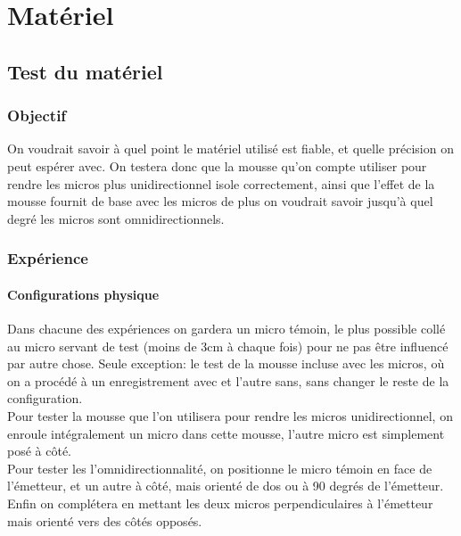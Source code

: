 

%

\part{Matériel}

\chapter{Test du matériel}

\section{Objectif}
On voudrait savoir à quel point le matériel utilisé est fiable, et quelle précision on peut espérer avec.
On testera donc que la mousse qu'on compte utiliser pour rendre les micros plus unidirectionnel isole correctement, ainsi que l'effet de la mousse fournit de base avec les micros de plus on voudrait savoir jusqu'à quel degré les micros sont omnidirectionnels.
\section{Expérience}

\subsection{Configurations physique}
Dans chacune des expériences on gardera un micro témoin, le plus possible collé au micro servant de test (moins de 3cm à chaque fois) pour ne pas être influencé par autre chose. Seule exception: le test de la mousse incluse avec les micros, où on a procédé à un enregistrement avec et l'autre sans, sans changer le reste de la configuration.\\
Pour tester la mousse que l'on utilisera pour rendre les micros unidirectionnel, on enroule intégralement un micro dans cette mousse, l'autre micro est simplement posé à côté.\\
Pour tester les l'omnidirectionnalité, on positionne le micro témoin en face de l'émetteur, et un autre à côté, mais orienté de dos ou à 90 degrés de l'émetteur. Enfin on complétera en mettant les deux micros perpendiculaires à l'émetteur mais orienté vers des côtés opposés.

